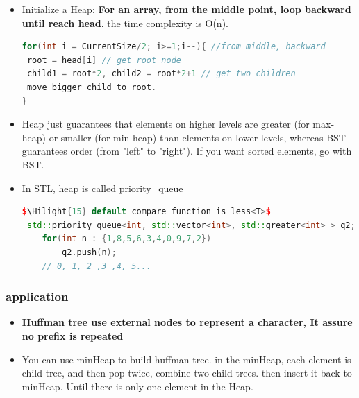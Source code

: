\documentclass[a4paper,12pt,twoside]{book}
\newcommand{\Hilight}[1]{\makebox[0pt][l]{\color{yellow}\rule[-3pt]{#1em}{11pt}}}
\begin{document}
\begin{itemize}
\begin{lstlisting}[frame=single, language=c++, mathescape=true]
  if(y>=heap[ci]{
   heap[i] = y;   // i always empty for a new value. 
   break; 
  }
  $\Hilight{10}$ //i is current node
      $\Hilight{10}$ //ci  is i biggest child node
  heap[i] = heap[ci]; //move up child, insert is "move down parent"
  i = ci;  //move to next level
  ci *=2;
}
\end{lstlisting}
\item Initialize a Heap: \textbf{For an array, from the middle point, loop backward until reach  head}. the time complexity is O(n). 

\begin{lstlisting}[frame=single, language=c++]
for(int i = CurrentSize/2; i>=1;i--){ //from middle, backward
 root = head[i] // get root node
 child1 = root*2, child2 = root*2+1 // get two children
 move bigger child to root.
}
\end{lstlisting}

\item Heap just guarantees that elements on higher levels are greater (for max-heap) or smaller (for min-heap) than elements on lower levels, whereas BST guarantees order (from "left" to "right"). If you want sorted elements, go with BST.

\item In STL, heap is called priority\_queue

\begin{lstlisting}[frame=single, language=c++, mathescape=true]
$\Hilight{15} default compare function is less<T>$
 std::priority_queue<int, std::vector<int>, std::greater<int> > q2;
    for(int n : {1,8,5,6,3,4,0,9,7,2})
        q2.push(n);
    // 0, 1, 2 ,3 ,4, 5...
\end{lstlisting}

\end{itemize}


\subsubsection{application}
\begin{itemize}
\item \textbf{Huffman tree use external nodes to represent a character, It assure no prefix is repeated }
\item You can use minHeap to build huffman tree. in the minHeap, each element is child tree, and then pop twice, combine two child trees. then insert it back to minHeap. Until there is only one element in the Heap. 
\end{itemize}
\end{document}
